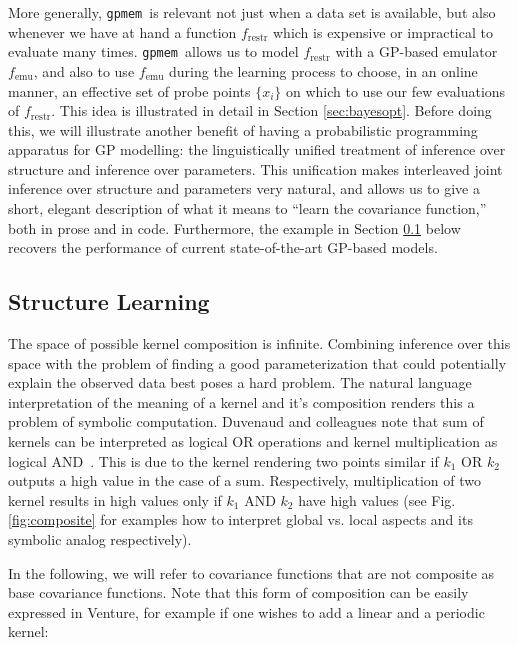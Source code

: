 \documentclass{article} %
\newcommand{\gpmem}{\texttt{gpmem}}
\newcommand{\emu}{{\textrm{emu}}}
\newcommand{\restr}{{\textrm{restr}}}
\begin{document}
More generally, \gpmem\ is relevant not just when a data set is available, but also whenever we have at hand a function $f_\restr$ which is expensive or impractical to evaluate many times.
\gpmem\ allows us to model $f_\restr$ with a GP-based emulator $f_\emu$, and also to use $f_\emu$ during the learning process to choose, in an online manner, an effective set of probe points $\{x_i\}$ on which to use our few evaluations of $f_\restr$.
This idea is illustrated in detail in Section \ref{sec:bayesopt}.
Before doing this, we will illustrate another benefit of having a probabilistic programming apparatus for GP modelling: the linguistically unified treatment of inference over structure and inference over parameters.
This unification makes interleaved joint inference over structure and parameters very natural, and allows us to give a short, elegant description of what it means to ``learn the covariance function,'' both in prose and in code.
Furthermore, the example in Section \ref{sec:structurelearning} below recovers the performance of current state-of-the-art GP-based models.



\subsection{Structure Learning}\label{sec:structurelearning}
The space of possible kernel composition is infinite. Combining inference over this space with the problem of finding a good parameterization that could potentially explain the observed data best poses a hard problem. The natural language interpretation of the meaning of a kernel and it's composition renders this a problem of symbolic computation. Duvenaud and colleagues note that sum of kernels can be interpreted as logical OR operations and kernel multiplication as logical AND~\citeyearpar{duvenaud2013structure}. This is due to the kernel rendering two points similar if $k_1$ OR $k_2$ outputs a high value in the case of a sum. Respectively, multiplication of two kernel results in high values only if $k_1$ AND $k_2$ have high values (see Fig. \ref{fig:composite} for examples how to interpret global vs. local aspects and its symbolic analog respectively). 

In the following, we will refer to covariance functions that are not composite as base covariance functions. Note that this form of composition can be easily expressed in Venture, for example if one wishes to add a linear and a periodic kernel:
\end{document}
